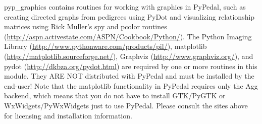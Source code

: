 

 pyp\_graphics contains routines for working with graphics in PyPedal, such as creating directed graphs from pedigrees using PyDot and visualizing relationship matrices using Rick Muller's spy and pcolor routines (\url{http://aspn.activestate.com/ASPN/Cookbook/Python/}). The Python Imaging Library (\url{http://www.pythonware.com/products/pil/}), matplotlib (\url{http://matplotlib.sourceforge.net/}), Graphviz (\url{http://www.graphviz.org/}), and pydot (\url{http://dkbza.org/pydot.html}) are required by one or more routines in this module. They ARE NOT distributed with PyPedal and must be installed by the end-user! Note that the matplotlib functionality in PyPedal requires only the Agg backend, which means that you do not have to install GTK/PyGTK or WxWidgets/PyWxWidgets just to use PyPedal. Please consult the sites above for licensing and installation information.
